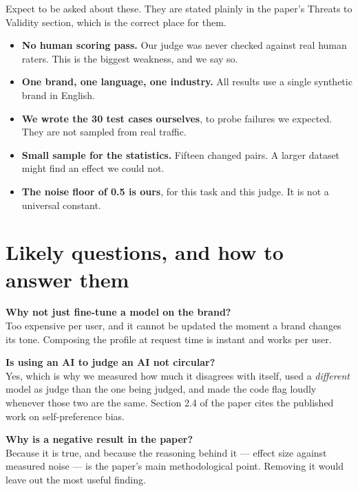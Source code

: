 \documentclass[11pt]{article}
\begin{document}
Expect to be asked about these. They are stated plainly in the paper's Threats
to Validity section, which is the correct place for them.

\begin{itemize}
\item \textbf{No human scoring pass.} Our judge was never checked against real
      human raters. This is the biggest weakness, and we say so.
\item \textbf{One brand, one language, one industry.} All results use a single
      synthetic brand in English.
\item \textbf{We wrote the 30 test cases ourselves}, to probe failures we
      expected. They are not sampled from real traffic.
\item \textbf{Small sample for the statistics.} Fifteen changed pairs. A larger
      dataset might find an effect we could not.
\item \textbf{The noise floor of 0.5 is ours}, for this task and this judge. It
      is not a universal constant.
\end{itemize}

\section{Likely questions, and how to answer them}

\textbf{Why not just fine-tune a model on the brand?}\\
Too expensive per user, and it cannot be updated the moment a brand changes its
tone. Composing the profile at request time is instant and works per user.

\vspace{5pt}
\noindent\textbf{Is using an AI to judge an AI not circular?}\\
Yes, which is why we measured how much it disagrees with itself, used a
\emph{different} model as judge than the one being judged, and made the code
flag loudly whenever those two are the same. Section 2.4 of the paper cites the
published work on self-preference bias.

\vspace{5pt}
\noindent\textbf{Why is a negative result in the paper?}\\
Because it is true, and because the reasoning behind it --- effect size against
measured noise --- is the paper's main methodological point. Removing it would
leave out the most useful finding.
\end{document}
